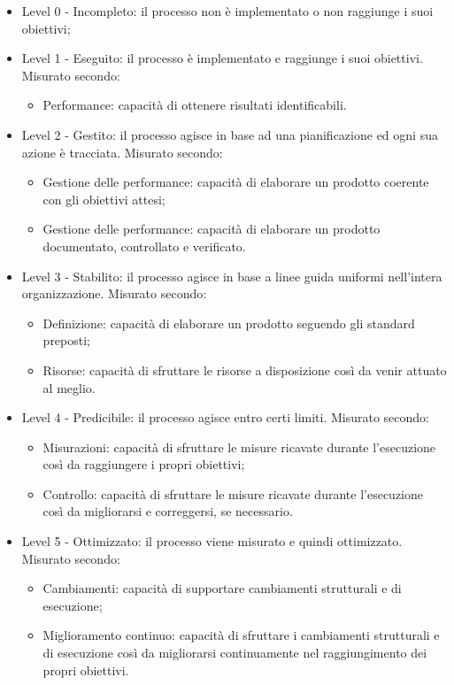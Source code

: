 \documentclass[../PianoDiQualifica.tex]{subfiles}
\begin{document}
		\begin{itemize}
			\item Level 0 - Incompleto: il processo non è implementato o non raggiunge i suoi obiettivi;
			\item Level 1 - Eseguito: il processo è implementato e raggiunge i suoi obiettivi.
			Misurato secondo:
				\begin{itemize}
					\item Performance: capacità di ottenere risultati identificabili.
				\end{itemize}
			\item Level 2 - Gestito: il processo agisce in base ad una pianificazione ed ogni sua azione è tracciata.
			Misurato secondo:
				\begin{itemize}
					\item Gestione delle performance: capacità di elaborare un prodotto coerente con gli obiettivi attesi;
					\item Gestione delle performance: capacità di elaborare un prodotto documentato, controllato e verificato.
				\end{itemize}
			\item Level 3 - Stabilito: il processo agisce in base a linee guida uniformi nell'intera organizzazione.
			Misurato secondo:
				\begin{itemize}
					\item Definizione: capacità di elaborare un prodotto seguendo gli standard preposti;
					\item Risorse: capacità di sfruttare le risorse a disposizione così da venir attuato al meglio.
				\end{itemize}
			\item Level 4 - Predicibile: il processo agisce entro certi limiti.
			Misurato secondo:
				\begin{itemize}
					\item Misurazioni: capacità di sfruttare le misure ricavate durante l'esecuzione così da raggiungere i propri obiettivi;
					\item Controllo: capacità di sfruttare le misure ricavate durante l'esecuzione così da migliorarsi e correggersi, se necessario.
				\end{itemize}
			\item Level 5 - Ottimizzato: il processo viene misurato e quindi ottimizzato.
			Misurato secondo:
				\begin{itemize}
					\item Cambiamenti: capacità di supportare cambiamenti strutturali e di esecuzione;
					\item Miglioramento continuo: capacità di sfruttare i cambiamenti strutturali e di esecuzione così da migliorarsi continuamente nel raggiungimento dei propri obiettivi.
				\end{itemize}
			\end{itemize}
\end{document}
